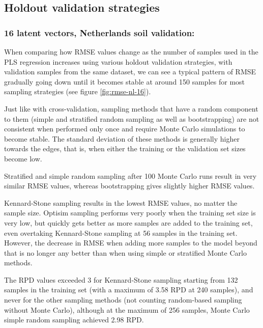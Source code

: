 \documentclass{isprs}
\begin{document}
\subsection{Holdout validation strategies}\label{sec:Holdout validation strategies 2}

\subsubsection{16 latent vectors, Netherlands soil validation:}\label{sec:NL16}

When comparing how RMSE values change as the number of samples used in the PLS regression increases using various holdout validation strategies, with validation samples from the same dataset, we can see a typical pattern of RMSE gradually going down until it becomes stable at around 150 samples for most sampling strategies (see figure \ref{fig:rmse-nl-16}).

Just like with cross-validation, sampling methods that have a random component to them (simple and stratified random sampling as well as bootstrapping) are not consistent when performed only once and require Monte Carlo simulations to become stable. The standard deviation of these methods is generally higher towards the edges, that is, when either the training or the validation set sizes become low.

Stratified and simple random sampling after 100 Monte Carlo runs result in very similar RMSE values, whereas bootstrapping gives slightly higher RMSE values.

Kennard-Stone sampling results in the lowest RMSE values, no matter the sample size. Optisim sampling performs very poorly when the training set size is very low, but quickly gets better as more samples are added to the training set, even overtaking Kennard-Stone sampling at 56 samples in the training set. However, the decrease in RMSE when adding more samples to the model beyond that is no longer any better than when using simple or stratified Monte Carlo methods.

The RPD values exceeded 3 for Kennard-Stone sampling starting from 132 samples in the training set (with a maximum of 3.58 RPD at 240 samples), and never for the other sampling methods (not counting random-based sampling without Monte Carlo), although at the maximum of 256 samples, Monte Carlo simple random sampling achieved 2.98 RPD.
\end{document}
